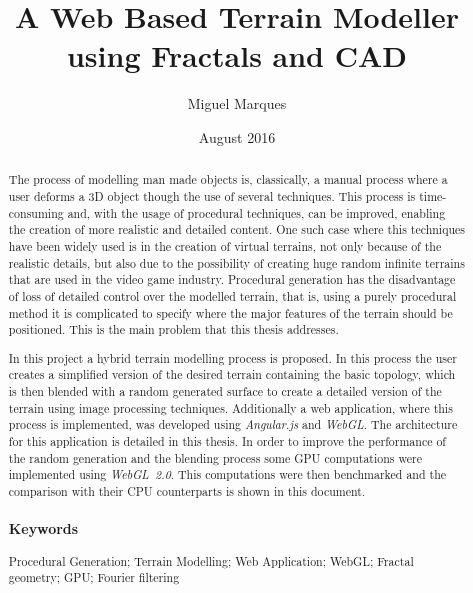 \documentclass[12pt, oneside]{book}
\title{A Web Based Terrain Modeller using Fractals and CAD}
\author{Miguel Marques}
\date{August 2016}
\begin{document}
%
%

\frontmatter

\maketitle

\pagestyle{plain}

\begin{abstract}
	\doublespacing
	
    The process of modelling man made objects is, classically, a manual process where a user deforms a 3D object though the use of several techniques. This process is time-consuming and, with the usage of procedural techniques, can be improved, enabling the creation of more realistic and detailed content. One such case where this techniques have been widely used is in the creation of virtual terrains, not only because of the realistic details, but also due to the possibility of creating huge random infinite terrains that are used in the video game industry.
    Procedural generation has the disadvantage of loss of detailed control over the modelled terrain, that is, using a purely procedural method it is complicated to specify where the major features of the terrain should be positioned. This is the main problem that this thesis addresses.
    
    In this project a hybrid terrain modelling process is proposed. In this process the user creates a simplified version of the desired terrain containing the basic topology, which is then blended with a random generated surface to create a detailed version of the terrain using image processing techniques. Additionally a web application, where this process is implemented, was developed using \textit{Angular.js} and \mbox{\textit{WebGL}}. The architecture for this application is detailed in this thesis. In order to improve the performance of the random generation and the blending process some GPU computations were implemented using \mbox{\textit{WebGL 2.0}}. This computations were then benchmarked and the comparison with their CPU counterparts is shown in this document.
    
    

	\subsubsection*{Keywords}
	Procedural Generation; Terrain Modelling; Web Application; WebGL; Fractal geometry; GPU; Fourier filtering
\end{abstract}
\end{document}
